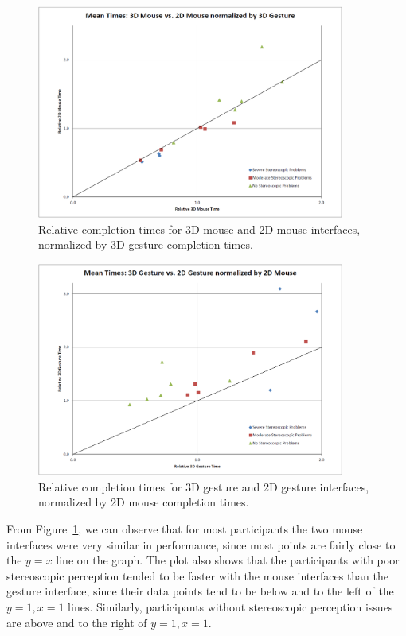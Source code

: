 \documentclass[pageno]{jpaper}
\begin{document}
\begin{figure}
\centering
\includegraphics[width=0.9\textwidth]{figures/f1.png}
\caption{Relative completion times for 3D mouse and 2D mouse interfaces,
normalized by 3D gesture completion times.}
\label{fig:mousevs3dg}
\end{figure}
\begin{figure}
\centering
\includegraphics[width=0.9\textwidth]{figures/f2.png}
\caption{Relative completion times for 3D gesture and 2D gesture interfaces,
normalized by 2D mouse completion times.}
\label{fig:gesturevs2dm}
\end{figure}

From Figure~\ref{fig:mousevs3dg}, we can observe that for most participants
the two mouse interfaces were very similar in performance, since most points
are fairly close to the $y = x$ line on the graph. The plot also shows that the
participants with poor stereoscopic perception tended to be faster with the
mouse interfaces than the gesture interface, since their data points tend to be below
and to the left of the $y = 1, x = 1$ lines. Similarly, participants without
stereoscopic perception issues are above and to the right of $y = 1, x = 1$.
\end{document}
